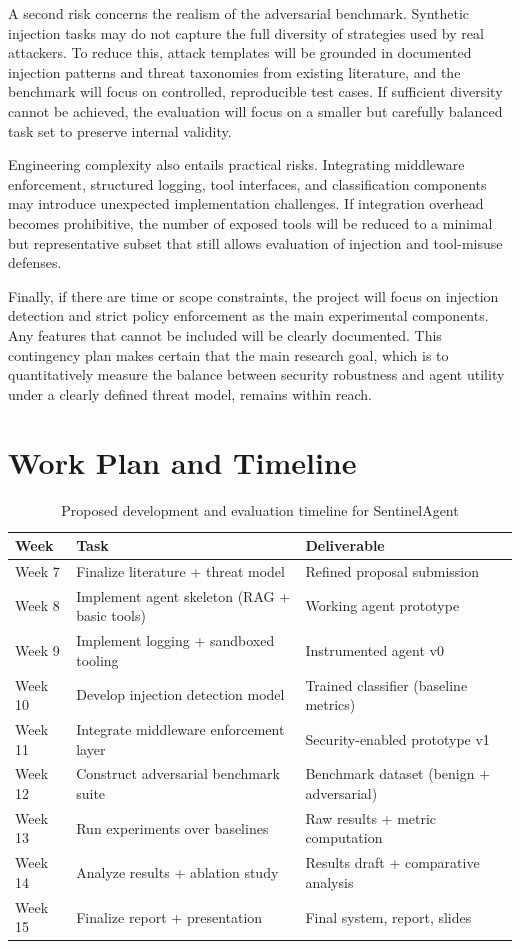 \documentclass[11pt]{article}
\begin{document}
A second risk concerns the realism of the adversarial benchmark. Synthetic injection tasks may do not capture the full diversity of strategies used by real attackers. To reduce this, attack templates will be grounded in documented injection patterns and threat taxonomies from existing literature, and the benchmark will focus on controlled, reproducible test cases. If sufficient diversity cannot be achieved, the evaluation will focus on a smaller but carefully balanced task set to preserve internal validity.

Engineering complexity also entails practical risks. Integrating middleware enforcement, structured logging, tool interfaces, and classification components may introduce unexpected implementation challenges. If integration overhead becomes prohibitive, the number of exposed tools will be reduced to a minimal but representative subset that still allows evaluation of injection and tool-misuse defenses. 

Finally, if there are time or scope constraints, the project will focus on injection detection and strict policy enforcement as the main experimental components. Any features that cannot be included will be clearly documented. This contingency plan makes certain that the main research goal, which is to quantitatively measure the balance between security robustness and agent utility under a clearly defined threat model, remains within reach.
\section{Work Plan and Timeline}

\begin{table}[H]
\centering
\begin{tabular}{lll}
\toprule
Week & Task & Deliverable \\
\midrule
Week 7 & Finalize literature + threat model & Refined proposal submission \\
Week 8 & Implement agent skeleton (RAG + basic tools) & Working agent prototype \\
Week 9 & Implement logging + sandboxed tooling & Instrumented agent v0 \\
Week 10 & Develop injection detection model & Trained classifier (baseline metrics) \\
Week 11 & Integrate middleware enforcement layer & Security-enabled prototype v1 \\
Week 12 & Construct adversarial benchmark suite & Benchmark dataset (benign + adversarial) \\
Week 13 & Run experiments over baselines & Raw results + metric computation \\
Week 14 & Analyze results + ablation study & Results draft + comparative analysis \\
Week 15 & Finalize report + presentation & Final system, report, slides \\
\bottomrule
\end{tabular}
\caption{Proposed development and evaluation timeline for SentinelAgent}
\end{table}
\end{document}
